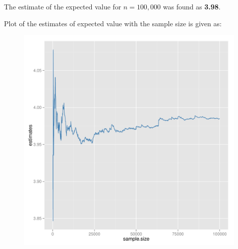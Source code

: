 \documentclass[12pt]{article}
\begin{document}
\begin{enumerate}[label=(\alph*)]
The estimate of the expected value for $n=100,000$ was found as \textbf{3.98}.

Plot of the estimates of expected value with the sample size is given as:
\begin{figure}[H]
\begin{centering}
\begin{knitrout}
\color{fgcolor}
\includegraphics[width=\maxwidth]{figure/unnamed-chunk-4-1} 


\end{knitrout}
\end{centering}
\end{figure}
\end{enumerate}
\end{document}
